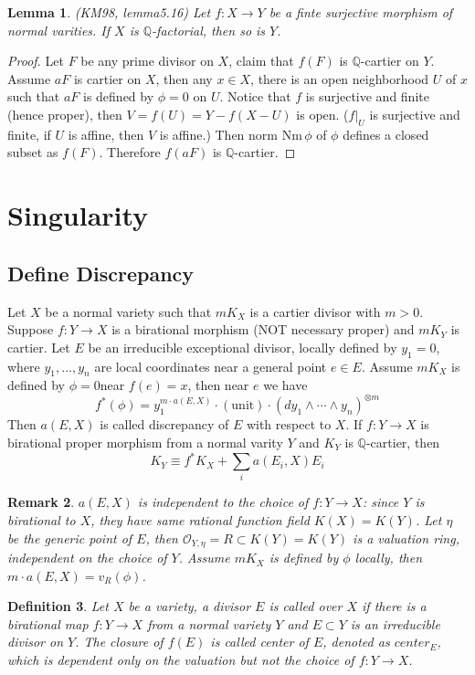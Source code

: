 \documentclass{article}
\newtheorem{defn}{Definition}[section]
\newtheorem{lem}[defn]{Lemma}
\newtheorem{rmk}[defn]{Remark}
\begin{document}
\begin{lem}
  (KM98, lemma5.16) Let $ f:X\to Y $ be a finte surjective morphism of normal varities. If $ X $ is $ \mathbb{Q} $-factorial, then so is $ Y $.
\end{lem}
\begin{proof}
  Let $ F $ be any prime divisor on $ X $, claim that $ f(F) $ is $ \mathbb{Q} $-cartier on $ Y $. Assume $ aF $ is cartier on $ X $, then any $ x\in X $, there is an open neighborhood $ U $ of $ x $ such that $ aF$ is defined by $ \phi=0 $ on $ U $. Notice that $ f $ is surjective and finite (hence proper), then $ V=f(U)=Y-f(X-U) $ is open. ($ f|_U $ is surjective and finite, if $ U $ is affine, then $ V $ is affine.) Then norm $ \mathrm{Nm}\, \phi $ of $ \phi $ defines a closed subset as $ f(F) $. Therefore $ f(aF) $ is $ \mathbb{Q} $-cartier. 
\end{proof}

\section{Singularity}
\subsection{Define Discrepancy}
Let $ X $ be a normal variety such that $ mK_X $ is a cartier divisor with $ m>0 $. Suppose $ f:Y\to X $ is a birational morphism (NOT necessary proper) and $ mK_Y $ is cartier. Let $ E $ be an irreducible exceptional divisor, locally defined by $ y_1=0 $, where $ y_1,\ldots ,y_n $ are local coordinates near a general point $ e\in E $. Assume $ mK_X $ is defined by $ \phi=0 $near $ f(e)=x $, then near $ e $ we have
\[ f^*(\phi)=y_1^{m\cdot a(E,X)}\cdot (\text{unit})\cdot (dy_1\wedge\cdots\wedge y_n)^{\otimes m} \]
Then $ a(E,X) $ is called discrepancy of $ E $ with respect to $ X $. If $ f:Y\to X $ is birational proper morphism from a normal varity $ Y $ and $ K_Y $ is $ \mathbb{Q} $-cartier, then
\[ K_Y\equiv f^*K_X+\sum_i a(E_i,X)E_i \]
\begin{rmk}
  $ a(E,X) $ is independent to the choice of $ f:Y\to X $: since $ Y $ is birational to $ X $, they have same rational function field $ K(X)=K(Y) $. Let $ \eta  $ be the generic point of $ E $, then $ \mathcal{O}_{Y,\eta}=R\subset K(Y)=K(Y) $ is a valuation ring, independent on the choice of $ Y $. Assume $ mK_X $ is defined by $ \phi $ locally, then $ m\cdot a(E,X)=v_R(\phi) $.
\end{rmk}

\begin{defn}
  Let $ X $ be a variety, a divisor $ E $ is called over $ X $ if there is a birational map $ f:Y\to X $ from a normal variety $ Y $ and $ E\subset Y $ is an irreducible divisor on $ Y $. The closure of $ f(E) $ is called center of $ E $, denoted as $ center_E $, which is dependent only on the valuation but not the choice of $ f:Y\to X $.
\end{defn}
\end{document}
